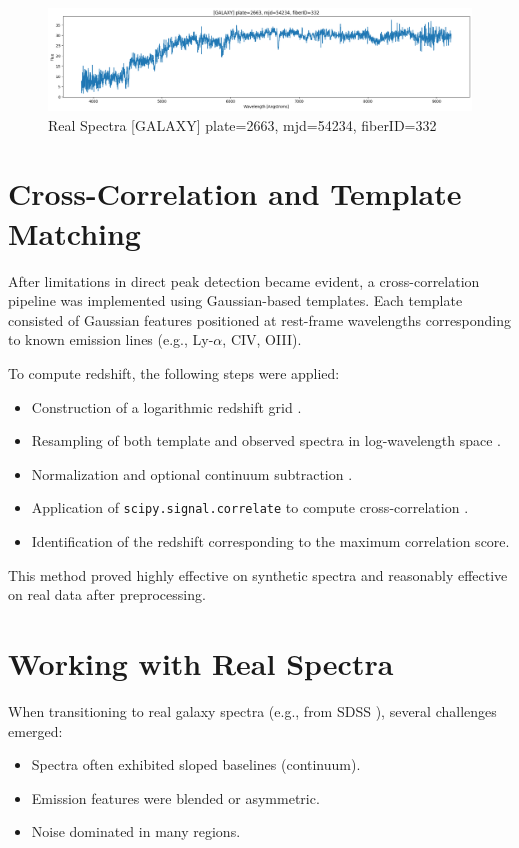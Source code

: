 \documentclass[12pt]{article}
\begin{document}
\begin{figure}[H]
    \centering
    \includegraphics[width=1\linewidth]{image2.png}
    \caption{Real Spectra [GALAXY] plate=2663, mjd=54234, fiberID=332}
    \label{fig:real}
\end{figure}


\section{Cross-Correlation and Template Matching}

After limitations in direct peak detection became evident, a cross-correlation pipeline was implemented using Gaussian-based templates. Each template consisted of Gaussian features positioned at rest-frame wavelengths corresponding to known emission lines (e.g., Ly-$\alpha$, CIV, OIII).

To compute redshift, the following steps were applied:
\begin{itemize}
\item Construction of a logarithmic redshift grid \cite{baldry2018logredshift}.
\item Resampling of both template and observed spectra in log-wavelength space \cite{baldry2018logredshift}.
\item Normalization and optional continuum subtraction \cite{scipy}.
\item Application of \texttt{scipy.signal.correlate} to compute cross-correlation \cite{scipy}.
\item Identification of the redshift corresponding to the maximum correlation score.
\end{itemize}

This method proved highly effective on synthetic spectra and reasonably effective on real data after preprocessing.


\section{Working with Real Spectra}

When transitioning to real galaxy spectra (e.g., from SDSS \cite{sdss}), several challenges emerged:
\begin{itemize}
\item Spectra often exhibited sloped baselines (continuum).
\item Emission features were blended or asymmetric.
\item Noise dominated in many regions.
\end{itemize}
\end{document}
